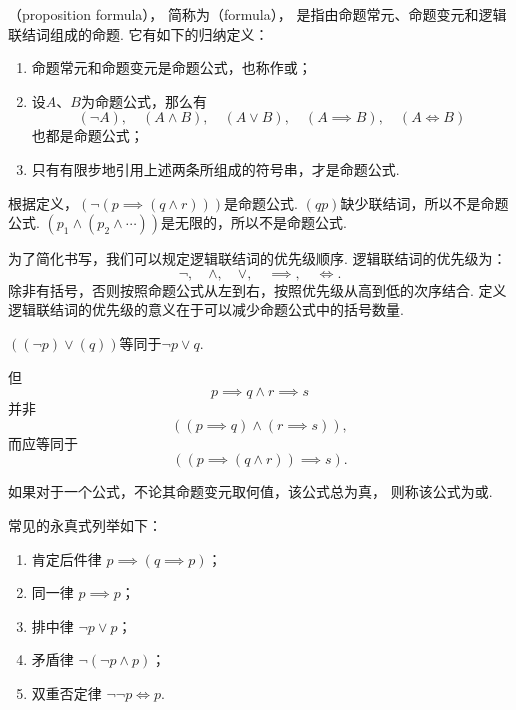 \begin{definition}
（proposition formula），%
简称为（formula），%
是指由命题常元、命题变元和逻辑联结词组成的命题.
它有如下的归纳定义：
\begin{enumerate}
\item 命题常元和命题变元是命题公式，也称作或；
\item 设\(A\)、\(B\)为命题公式，那么有\[
(\neg A),\quad
(A \land B),\quad
(A \lor B),\quad
(A \implies B),\quad
(A \iff B)
\]也都是命题公式；
\item 只有有限步地引用上述两条所组成的符号串，才是命题公式.
\end{enumerate}
\end{definition}

\begin{example}
根据定义，\((\neg(p \implies (q \land r)))\)是命题公式.
\((qp)\)缺少联结词，所以不是命题公式.
\((p_1 \land (p_2 \land \dotsb))\)是无限的，所以不是命题公式.
\end{example}

为了简化书写，我们可以规定逻辑联结词的优先级顺序.
逻辑联结词的优先级为：\[
\neg,\quad \land,\quad \lor,\quad \implies,\quad \iff.
\]除非有括号，否则按照命题公式从左到右，按照优先级从高到低的次序结合.
定义逻辑联结词的优先级的意义在于可以减少命题公式中的括号数量.

\begin{example}
\(((\neg p) \lor (q))\)等同于\(\neg p \lor q\).

但\[
	p \implies q \land r \implies s
\]并非\[
	((p \implies q) \land (r \implies s)),
\]而应等同于\[
	((p \implies (q \land r)) \implies s).
\]
\end{example}

\begin{definition}
如果对于一个公式，不论其命题变元取何值，该公式总为真，%
则称该公式为或.
\end{definition}

常见的永真式列举如下：\begin{enumerate}
\item 肯定后件律 \(p \implies (q \implies p)\)；
\item 同一律 \(p \implies p\)；
\item 排中律 \(\neg p \lor p\)；
\item 矛盾律 \(\neg(\neg p \land p)\)；
\item 双重否定律 \(\neg\neg p \iff p\).
\end{enumerate}
